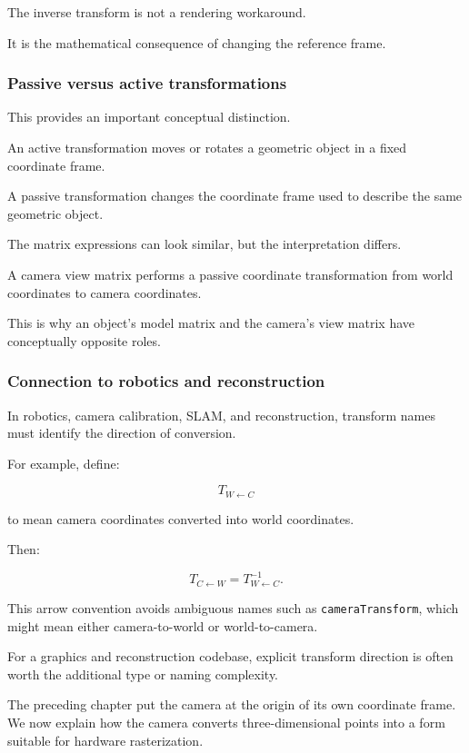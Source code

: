 The inverse transform is not a rendering workaround.

It is the mathematical consequence of changing the reference frame.

\subsubsection{Passive versus active transformations}\label{passive-versus-active-transformations}

This provides an important conceptual distinction.

An active transformation moves or rotates a geometric object in a fixed coordinate frame.

A passive transformation changes the coordinate frame used to describe the same geometric object.

The matrix expressions can look similar, but the interpretation differs.

A camera view matrix performs a passive coordinate transformation from world coordinates to camera coordinates.

This is why an object's model matrix and the camera's view matrix have conceptually opposite roles.

\subsubsection{Connection to robotics and reconstruction}\label{connection-to-robotics-and-reconstruction}

In robotics, camera calibration, SLAM, and reconstruction, transform names must identify the direction of conversion.

For example, define:

\[
 T_{W\leftarrow C}
\]

to mean camera coordinates converted into world coordinates.

Then:

\[
 T_{C\leftarrow W} = T_{W\leftarrow C}^{-1}.
\]

This arrow convention avoids ambiguous names such as \texttt{cameraTransform}, which might mean either camera-to-world or world-to-camera.

For a graphics and reconstruction codebase, explicit transform direction is often worth the additional type or naming complexity.

The preceding chapter put the camera at the origin of its own coordinate frame. We now explain how the camera converts three-dimensional points into a form suitable for hardware rasterization.

